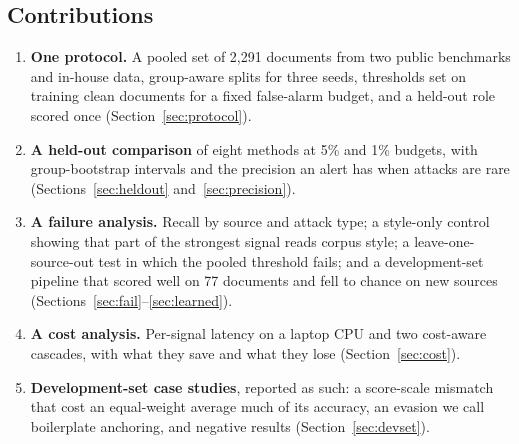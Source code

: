 \subsection{Contributions}
\begin{enumerate}
  \item \textbf{One protocol.} A pooled set of 2,291 documents from two public
    benchmarks and in-house data, group-aware splits for three seeds, thresholds set
    on training clean documents for a fixed false-alarm budget, and a held-out
    role scored once (Section~\ref{sec:protocol}).
  \item \textbf{A held-out comparison} of eight methods at 5\% and 1\% budgets,
    with group-bootstrap intervals and the precision an alert has when attacks are
    rare (Sections~\ref{sec:heldout} and~\ref{sec:precision}).
  \item \textbf{A failure analysis.} Recall by source and attack type; a
    style-only control showing that part of the strongest signal reads corpus style;
    a leave-one-source-out test in which the pooled threshold fails; and a
    development-set pipeline that scored well on 77 documents and fell to chance on
    new sources (Sections~\ref{sec:fail}--\ref{sec:learned}).
  \item \textbf{A cost analysis.} Per-signal latency on a laptop CPU and two
    cost-aware cascades, with what they save and what they lose
    (Section~\ref{sec:cost}).
  \item \textbf{Development-set case studies}, reported as such: a score-scale
    mismatch that cost an equal-weight average much of its accuracy, an evasion we
    call boilerplate anchoring, and negative results (Section~\ref{sec:devset}).
\end{enumerate}